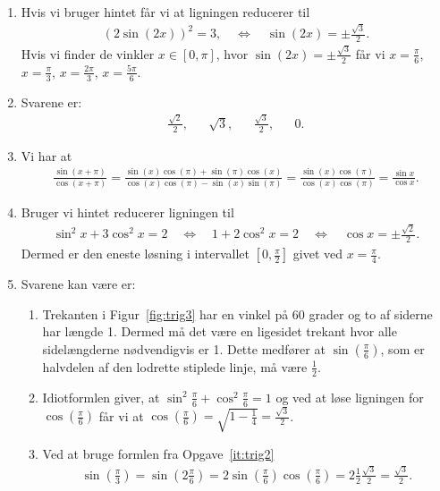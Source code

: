 \begin{enumerate}
	\item Hvis vi bruger hintet får vi at ligningen reducerer til
	\begin{align*}
	(2\sin(2x))^2=3,\quad\Leftrightarrow\quad \sin(2x)=\pm \frac{\sqrt{3}}{2}.
	\end{align*}
	Hvis vi finder de vinkler $x\in [0,\pi]$, hvor $\sin(2x)=\pm\frac{\sqrt{3}}{2}$ får vi	$x=\frac{\pi}{6}$, $x=\frac{\pi}{3}$, $x=\frac{2\pi}{3}$, $x=\frac{5\pi}{6}$.
	
	
	\item Svarene er:
	\begin{align*}
	\frac{\sqrt{2}}{2},&& \sqrt{3},&& \frac{\sqrt{3}}{2},&& 0.
	\end{align*}
	
	\item Vi har at 
	\begin{align*}
	\frac{\sin(x+\pi)}{\cos(x+\pi)}=\frac{\sin(x)\cos(\pi)+\sin(\pi)\cos(x)}{\cos(x)\cos(\pi)-\sin(x)\sin(\pi)}=\frac{\sin(x)\cos(\pi)}{\cos(x)\cos(\pi)}=\frac{\sin x}{\cos x}.
	\end{align*}
	
	\item Bruger vi hintet reducerer ligningen til
	\begin{align*}
	\sin^2 x+ 3\cos^2 x=2\quad \Leftrightarrow\quad 1+2\cos^2 x=2\quad \Leftrightarrow\quad \cos x =\pm \frac{\sqrt{2}}{2}.
	\end{align*}
	Dermed er den eneste løsning i intervallet $[0,\frac{\pi}{2}]$ givet ved $x=\frac{\pi}{4}$.
	
	\item \label{it:trig3ans} Svarene kan være er:
	
	\begin{enumerate}
		\item Trekanten i Figur~\ref{fig:trig3} har en vinkel på $60$ grader og to af siderne har længde 1. Dermed må det være en ligesidet trekant hvor alle sidelængderne nødvendigvis er 1. Dette medfører at $\sin(\frac{\pi}{6})$, som er halvdelen af den lodrette stiplede linje, må være $\frac{1}{2}$.
		
		\item Idiotformlen giver, at $\sin^2 \frac{\pi}{6}+\cos^2\frac{\pi}{6}=1$ og ved at løse ligningen for $\cos(\frac{\pi}{6})$ får vi at $ \cos(\frac{\pi}{6})=\sqrt{1-\frac{1}{4}}=\frac{\sqrt{3}}{2} $.
		
		\item Ved at bruge formlen fra Opgave~\ref{it:trig2}
		\begin{align*}
		 \sin(\frac{\pi}{3})=\sin(2\frac{\pi}{6}) =2\sin(\frac{\pi}{6})\cos(\frac{\pi}{6})=2\frac{1}{2}\frac{\sqrt{3}}{2}=\frac{\sqrt{3}}{2}.
		\end{align*}
		

\end{enumerate}
\end{enumerate}
